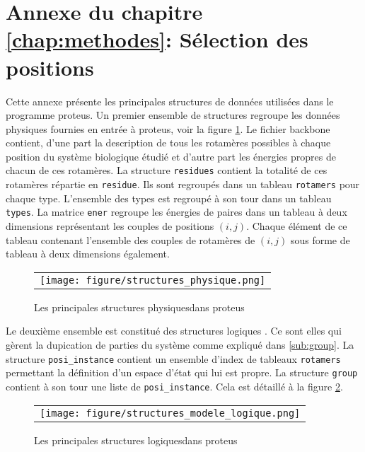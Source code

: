 \chapter*{Annexe du chapitre \ref{chap:methodes}: Sélection des positions }
\label{chap:annexeproteus}

Cette annexe présente les principales structures de données utilisées dans le programme proteus. Un premier ensemble de structures regroupe les données physiques fournies en entrée à proteus, voir la figure \ref{fig:structPhy}. Le fichier backbone contient, d'une part la description de tous les rotamères possibles à chaque position du système biologique étudié et d'autre part les énergies propres de chacun de ces rotamères. La structure \verb!residues! contient la totalité de ces rotamères répartie en \verb!residue!. Ils sont regroupés dans un tableau \verb!rotamers!  pour chaque type. L'ensemble des types est regroupé à son tour dans un tableau \verb!types!. La matrice \verb!ener! regroupe les énergies de paires dans un tableau à deux dimensions représentant les couples de positions $(i,j)$. Chaque élément de ce tableau contenant l'ensemble des couples de rotamères de $(i,j)$  sous forme de tableau à deux dimensions également.

   \begin{figure}[!htbp]
     \centering
     \begin{tabular}{c}
       \texttt{[image: figure/structures\_physique.png]} 
     \end{tabular}
     
     \caption{Les principales structures \og physiques\fg dans proteus}
\label{fig:structPhy}
   \end{figure}

 Le deuxième ensemble est constitué des structures \og logiques \fg. Ce sont elles qui gèrent la dupication de parties du système comme expliqué dans \ref{sub:group}. La structure \verb!posi_instance! contient un ensemble d'index de tableaux \verb!rotamers! permettant la définition d'un espace d'état qui lui est propre. La structure \verb!group! contient à son tour une liste de \verb!posi_instance!. Cela est détaillé à la figure  \ref{fig:structLog}.   

 
   \begin{figure}[!htbp]
     \centering
     \begin{tabular}{c}
       \texttt{[image: figure/structures\_modele\_logique.png]} 
     \end{tabular}
     
     \caption{Les principales structures \og logiques\fg dans proteus}
\label{fig:structLog}
   \end{figure}

